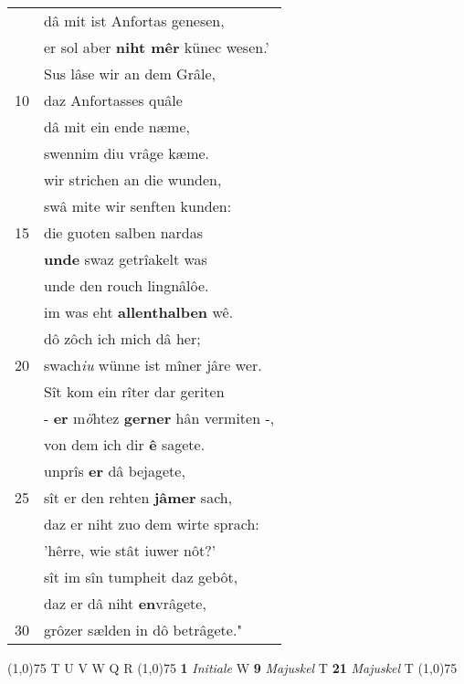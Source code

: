 \documentclass[8pt,a4paper,notitlepage]{article}
\begin{document}
\begin{table}[ht]
\begin{minipage}[t]{0.5\linewidth}
\begin{tabular}{rl}
 & dâ mit ist Anfortas genesen,\\ 
 & er sol aber \textbf{niht mêr} künec wesen.'\\ 
 & Sus lâse wir an dem Grâle,\\ 
10 & daz Anfortasses quâle\\ 
 & dâ mit ein ende næme,\\ 
 & swennim diu vrâge kæme.\\ 
 & wir strichen an die wunden,\\ 
 & swâ mite wir senften kunden:\\ 
15 & die guoten salben nardas\\ 
 & \textbf{unde} swaz getrîakelt was\\ 
 & unde den rouch lingnâlôe.\\ 
 & im was eht \textbf{allenthalben} wê.\\ 
 & dô zôch ich mich dâ her;\\ 
20 & swach\textit{iu} wünne ist mîner jâre wer.\\ 
 & Sît kom ein rîter dar geriten\\ 
 & - \textbf{er} m\textit{ö}htez \textbf{gerner} hân vermiten -,\\ 
 & von dem ich dir \textbf{ê} sagete.\\ 
 & unprîs \textbf{er} dâ bejagete,\\ 
25 & sît er den rehten \textbf{jâmer} sach,\\ 
 & daz er niht zuo dem wirte sprach:\\ 
 & 'hêrre, wie stât iuwer nôt?'\\ 
 & sît im sîn tumpheit daz gebôt,\\ 
 & daz er dâ niht \textbf{en}vrâgete,\\ 
30 & grôzer sælden in dô betrâgete."\\ 
\end{tabular}
\scriptsize
\line(1,0){75} \newline
T U V W Q R \newline
\line(1,0){75} \newline
\textbf{1} \textit{Initiale} W  \textbf{9} \textit{Majuskel} T  \textbf{21} \textit{Majuskel} T  \newline
\line(1,0){75} \newline

\end{minipage}
\end{table}
\end{document}

